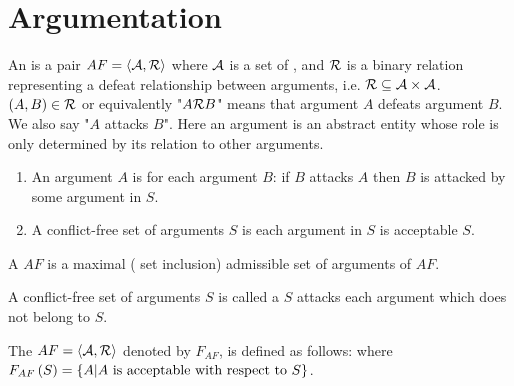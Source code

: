 \section{Argumentation}

\begin{defi}
An  is a pair $AF=\left\langle \mathcal{A},\mathcal{R}\right\rangle$ where $\mathcal{A}$ is a set of , and $\mathcal{R}$ is a binary relation representing a defeat relationship between arguments, i.e. $\mathcal{R}\subseteq\mathcal{A}\times\mathcal{A}$. $\left( A,B\right)\in\mathcal{R}$ or equivalently "$A\mathcal{R} B$" means that argument $A$ defeats argument $B$. We also say "$A$ attacks $B$". Here an argument is an abstract entity whose role is only determined by its relation to other arguments.
\cite{conf/ijcai/Dung93}
\end{defi}

\begin{defi}
\begin{enumerate}
 \item An argument $A$ is  \iffTx{} for each argument $B$: if $B$ attacks $A$ then $B$ is attacked by some argument in $S$.
 \item A conflict-free set of arguments $S$ is  \iffTx{} each argument in $S$ is acceptable \wrtTx{} $S$.
\end{enumerate}
\cite{conf/ijcai/Dung93}
\end{defi}

\begin{defi}
A  $AF$ is a maximal (\wrtTx{} set inclusion) admissible set of arguments of $AF$.
\cite{conf/ijcai/Dung93}
\end{defi}

\begin{defi}
A conflict-free set of arguments $S$ is called a  \iffTx{} $S$ attacks each argument which does not belong to $S$.
\cite{conf/ijcai/Dung93}
\end{defi}

\begin{defi}
The  $AF=\left\langle \mathcal{A},\mathcal{R}\right\rangle$ denoted by $F_{AF}$, is defined as follows:  where $F_{AF}\left(S\right)=\left\{ A|A\mbox{ is acceptable with respect to{} }S\right\}$.
\cite{conf/ijcai/Dung93}
\end{defi}

